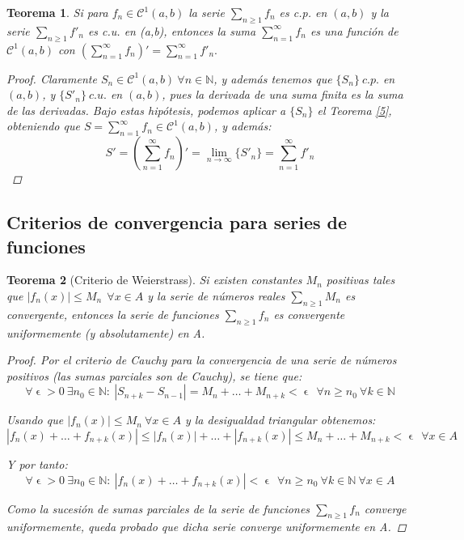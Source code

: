 \documentclass[11pt, a4paper]{article}
\let\epsilon\upvarepsilon
\theoremstyle{theorem-style}
\newtheorem{nth}{Teorema}[section]
\theoremstyle{definition-style}
\theoremstyle{remark-style}
\theoremstyle{example-style}
\begin{document}
\begin{nth} \label{9}
  Si para $f_n\in \mathcal{C}^1(a,b)$  la serie  $\sum_{n\geq 1} f_n $ es  c.p.  en $(a,b)$ y  la serie  $ \sum_{n\geq 1} f'_n $ es  c.u. en (a,b), entonces la suma $\displaystyle \sum_{n=1}^{\infty} f_n $ es una funci\'on de  $\mathcal{C}^1(a,b)$ con 
  $
  \displaystyle \left( \sum_{n=1}^{\infty} f_n \right)' =  \sum_{n=1}^{\infty}  f'_n  .
  $

  \begin{proof}
    Claramente $S_n \in \mathcal{C}^1(a,b)\ \forall n \in \mathbb{N}$, y además tenemos que $\{S_n\}\ c.p.$ en $(a,b)$, y $\{S'_n\}\ c.u.$ en $(a,b)$, pues la derivada de una suma finita es la suma de las derivadas. Bajo estas hipótesis, podemos aplicar a $\{S_n\}$ el \textit{Teorema \ref{5}}, obteniendo que $S = \sum_{n=1}^{\infty} f_n \in \mathcal{C}^1(a,b)$, y además:
    $$S' = \left( \sum_{n=1}^{\infty} f_n \right)' = \lim_{n \to \infty} \{S'_n\} = \sum_{n=1}^{\infty} f'_n$$
  \end{proof}
\end{nth}

\subsection{Criterios de convergencia para series de funciones}

\begin{nth}[Criterio de Weierstrass] \label{10}
  Si existen constantes $ M_{n} $ positivas tales que $ |f_{n}(x)| \leq M_{n}\ \ \forall x \in A$ y la serie de números reales $ \sum_{n \ge 1}M_{n} $ es convergente, entonces la serie de funciones $ \sum_{n \ge 1}f_{n} $ es convergente uniformemente (y absolutamente) en A.
  
  \begin{proof}
    Por el criterio de Cauchy para la convergencia de una serie de números positivos (las sumas parciales son de Cauchy), se tiene que:
    $$ \forall \epsilon > 0\ \exists n_{0} \in \mathbb{N}:\ |S_{n+k} - S_{n-1}| = M_{n} + \dots + M_{n+k} < \epsilon\ \  \forall n \geq n_{0}\ \forall k \in \mathbb{N} $$
    
    Usando que $ |f_{n}(x)| \leq M_{n}\ \forall x \in A $ y la desigualdad triangular obtenemos:
    $$ |f_{n}(x) + \dots + f_{n+k}(x)| \leq |f_{n}(x)| + \dots + |f_{n+k}(x)| \leq M_{n} + \dots + M_{n+k} < \epsilon\ \ \forall x \in A $$
    
    Y por tanto:
    $$\forall \epsilon > 0\ \exists n_{0} \in \mathbb{N}:\ |f_{n}(x) + \dots + f_{n+k}(x)| < \epsilon\ \  \forall n \geq n_{0}\ \forall k \in \mathbb{N}\ \forall x \in A $$
    
    Como la sucesión de sumas parciales de la serie de funciones $\sum_{n\ge 1} f_n$ converge uniformemente, queda probado que dicha serie converge uniformemente en A.
  \end{proof}
\end{nth}
\end{document}
